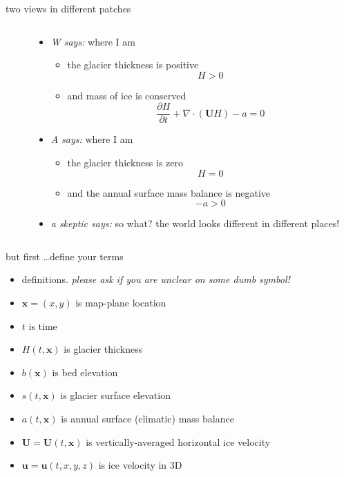 \documentclass[10pt,hyperref,dvipsnames]{beamer}
\newcommand{\bx}{\mathbf{x}}
\newcommand{\bu}{\mathbf{u}}
\newcommand{\bU}{\mathbf{U}}
\newcommand{\Div}{\nabla\cdot}
\begin{document}
\begin{frame}{two views in different patches}
\begin{columns}
\begin{column}{0.25\textwidth}
\bigskip

\bigskip
\end{column}
\begin{column}{0.75\textwidth}
\begin{itemize}
\item \emph{W says:} where I am
    \begin{itemize}
    \item[] the glacier thickness is positive
        $$H>0$$
    \item[] and mass of ice is conserved
        $$\frac{\partial H}{\partial t} + \Div \left(\bU H\right) - a = 0$$
    \end{itemize}
\item \emph{A says:} where I am
    \begin{itemize}
    \item[] the glacier thickness is zero
        $$H=0$$
    \item[] and the annual surface mass balance is negative
        $$-a > 0$$
    \end{itemize}

\medskip
\item<2> \emph{a skeptic says:} so what?  the world looks different in different places!
\end{itemize}
\end{column}
\end{columns}
\end{frame}


\begin{frame}{but first \dots define your terms}
\begin{itemize}
\item definitions.  \emph{please ask if you are unclear on some dumb symbol!}

\bigskip
\item $\bx = (x,y)$ is map-plane location
\item $t$ is time

\medskip
\item $H(t,\bx)$ is glacier thickness
\item $b(\bx)$ is bed elevation
\item $s(t,\bx)$ is glacier surface elevation
\item $a(t,\bx)$ is annual surface (climatic) mass balance
\item $\bU = \bU(t,\bx)$ is vertically-averaged horizontal ice velocity
\item $\bu = \bu(t,x,y,z)$ is ice velocity in 3D
\end{itemize}
\end{frame}
\end{document}
